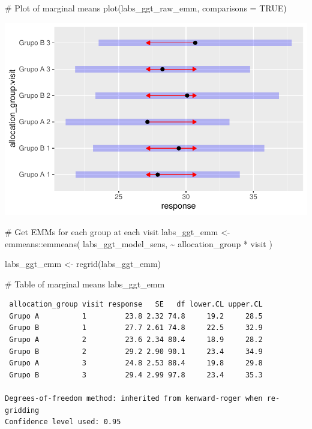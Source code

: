 \documentclass[
  letterpaper,
  DIV=11,
  numbers=noendperiod]{scrartcl}
\newenvironment{Shaded}{\begin{snugshade}}{\end{snugshade}}
\newcommand{\AttributeTok}[1]{\textcolor[rgb]{0.40,0.45,0.13}{#1}}
\newcommand{\CommentTok}[1]{\textcolor[rgb]{0.37,0.37,0.37}{#1}}
\newcommand{\ConstantTok}[1]{\textcolor[rgb]{0.56,0.35,0.01}{#1}}
\newcommand{\FunctionTok}[1]{\textcolor[rgb]{0.28,0.35,0.67}{#1}}
\newcommand{\NormalTok}[1]{\textcolor[rgb]{0.00,0.23,0.31}{#1}}
\newcommand{\OtherTok}[1]{\textcolor[rgb]{0.00,0.23,0.31}{#1}}
\newcommand{\SpecialCharTok}[1]{\textcolor[rgb]{0.37,0.37,0.37}{#1}}
\begin{document}
\begin{Shaded}
\begin{Highlighting}[]
\CommentTok{\# Plot of marginal means}
\FunctionTok{plot}\NormalTok{(labs\_ggt\_raw\_emm, }\AttributeTok{comparisons =} \ConstantTok{TRUE}\NormalTok{)}
\end{Highlighting}
\end{Shaded}

\includegraphics{Outcomes_V1V2V3_files/figure-pdf/labs_ggt_raw_emm-1.pdf}

\begin{Shaded}
\begin{Highlighting}[]
\CommentTok{\# Get EMMs for each group at each visit}
\NormalTok{labs\_ggt\_emm }\OtherTok{\textless{}{-}}\NormalTok{ emmeans}\SpecialCharTok{::}\FunctionTok{emmeans}\NormalTok{(}
\NormalTok{    labs\_ggt\_model\_sens, }
    \SpecialCharTok{\textasciitilde{}}\NormalTok{ allocation\_group }\SpecialCharTok{*}\NormalTok{ visit}
\NormalTok{)}

\NormalTok{labs\_ggt\_emm }\OtherTok{\textless{}{-}} \FunctionTok{regrid}\NormalTok{(labs\_ggt\_emm)}

\CommentTok{\# Table of marginal means}
\NormalTok{labs\_ggt\_emm}
\end{Highlighting}
\end{Shaded}

\begin{verbatim}
 allocation_group visit response   SE   df lower.CL upper.CL
 Grupo A          1         23.8 2.32 74.8     19.2     28.5
 Grupo B          1         27.7 2.61 74.8     22.5     32.9
 Grupo A          2         23.6 2.34 80.4     18.9     28.2
 Grupo B          2         29.2 2.90 90.1     23.4     34.9
 Grupo A          3         24.8 2.53 88.4     19.8     29.8
 Grupo B          3         29.4 2.99 97.8     23.4     35.3

Degrees-of-freedom method: inherited from kenward-roger when re-gridding 
Confidence level used: 0.95 
\end{verbatim}
\end{document}

